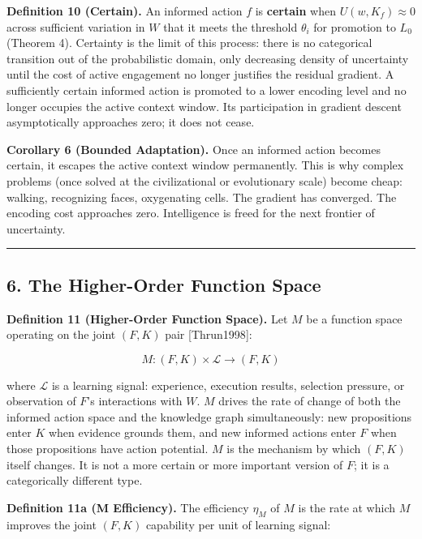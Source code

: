 \documentclass[
]{article}
\begin{document}
\textbf{Definition 10 (Certain).} An informed action \(f\) is
\textbf{certain} when \(U(w, K_f) \approx 0\) across sufficient
variation in \(W\) that it meets the threshold \(\theta_i\) for
promotion to \(L_0\) (Theorem 4). Certainty is the limit of this
process: there is no categorical transition out of the probabilistic
domain, only decreasing density of uncertainty until the cost of active
engagement no longer justifies the residual gradient. A sufficiently
certain informed action is promoted to a lower encoding level and no
longer occupies the active context window. Its participation in gradient
descent asymptotically approaches zero; it does not cease.

\textbf{Corollary 6 (Bounded Adaptation).} Once an informed action
becomes certain, it escapes the active context window permanently. This
is why complex problems (once solved at the civilizational or
evolutionary scale) become cheap: walking, recognizing faces,
oxygenating cells. The gradient has converged. The encoding cost
approaches zero. Intelligence is freed for the next frontier of
uncertainty.

\begin{center}\rule{0.5\linewidth}{0.5pt}\end{center}

\subsection{6. The Higher-Order Function
Space}\label{the-higher-order-function-space}

\textbf{Definition 11 (Higher-Order Function Space).} Let \(M\) be a
function space operating on the joint \((F, K)\) pair {[}Thrun1998{]}:

\[M : (F, K) \times \mathcal{L} \rightarrow (F, K)\]

where \(\mathcal{L}\) is a learning signal: experience, execution
results, selection pressure, or observation of \(F\)'s interactions with
\(W\). \(M\) drives the rate of change of both the informed action space
and the knowledge graph simultaneously: new propositions enter \(K\)
when evidence grounds them, and new informed actions enter \(F\) when
those propositions have action potential. \(M\) is the mechanism by
which \((F, K)\) itself changes. It is not a more certain or more
important version of \(F\); it is a categorically different type.

\textbf{Definition 11a (M Efficiency).} The efficiency \(\eta_M\) of
\(M\) is the rate at which \(M\) improves the joint \((F, K)\)
capability per unit of learning signal:
\end{document}
